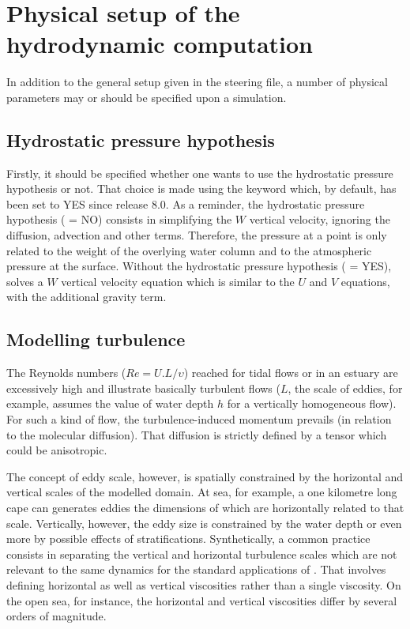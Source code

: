 \chapter{Physical setup of the hydrodynamic computation}

In addition to the general setup given in the steering file, a number of
physical parameters may or should be specified upon a simulation.


\section{Hydrostatic pressure hypothesis}

Firstly, it should be specified whether one wants to use the hydrostatic
pressure hypothesis or not. That choice is made using the keyword
 which, by default, has been set to YES since
release 8.0.
As a reminder, the hydrostatic pressure hypothesis
( = NO)
consists in simplifying the
$W$ vertical velocity, ignoring the diffusion, advection and other
terms. Therefore, the pressure at a point is only related to the weight of the
overlying water column and to the atmospheric pressure at the surface. Without
the hydrostatic pressure hypothesis ( = YES),
 solves a $W$ vertical velocity equation which is similar to
the $U$ and $V$ equations, with the additional gravity term.


\section{Modelling turbulence}

The Reynolds numbers ($Re = U.L/\upsilon$) reached for tidal
flows or in an estuary are excessively high and illustrate basically turbulent
flows ($L$, the scale of eddies, for example, assumes the value of water
depth $h$ for a vertically homogeneous flow). For such a kind of flow,
the turbulence-induced momentum prevails (in relation to the molecular
diffusion). That diffusion is strictly defined by a tensor which could be
anisotropic.

The concept of eddy scale, however, is spatially constrained by the horizontal
and vertical scales of the modelled domain. At sea, for example, a one
kilometre long cape can generates eddies the dimensions of which are
horizontally related to that scale. Vertically, however, the eddy size is
constrained by the water depth or even more by possible effects of
stratifications. Synthetically, a common practice consists in separating the
vertical and horizontal turbulence scales which are not relevant to the same
dynamics for the standard applications of . That involves defining
horizontal as well as vertical viscosities rather than a single viscosity. On
the open sea, for instance, the horizontal and vertical viscosities differ by
several orders of magnitude.

